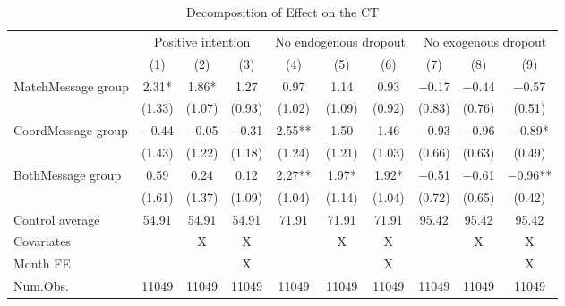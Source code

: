 \documentclass[12pt, a4paper]{article}
\begin{document}
\begin{table}[H]

\caption{\label{tab:lm-test-decompose}Decomposition of Effect on the CT}
\centering
\fontsize{8}{10}\selectfont
\begin{threeparttable}
\begin{tabular}[t]{>{\raggedright\arraybackslash}p{20em}ccccccccc}
\toprule
\multicolumn{1}{c}{ } & \multicolumn{3}{c}{Positive intention} & \multicolumn{3}{c}{No endogenous dropout} & \multicolumn{3}{c}{No exogenous dropout} \\
\cmidrule(l{3pt}r{3pt}){2-4} \cmidrule(l{3pt}r{3pt}){5-7} \cmidrule(l{3pt}r{3pt}){8-10}
  & (1) & (2) & (3) & (4) & (5) & (6) & (7) & (8) & (9)\\
\midrule
MatchMessage group & \num{2.31}* & \num{1.86}* & \num{1.27} & \num{0.97} & \num{1.14} & \num{0.93} & \num{-0.17} & \num{-0.44} & \num{-0.57}\\
 & (\num{1.33}) & (\num{1.07}) & (\num{0.93}) & (\num{1.02}) & (\num{1.09}) & (\num{0.92}) & (\num{0.83}) & (\num{0.76}) & (\num{0.51})\\
CoordMessage group & \num{-0.44} & \num{-0.05} & \num{-0.31} & \num{2.55}** & \num{1.50} & \num{1.46} & \num{-0.93} & \num{-0.96} & \num{-0.89}*\\
 & (\num{1.43}) & (\num{1.22}) & (\num{1.18}) & (\num{1.24}) & (\num{1.21}) & (\num{1.03}) & (\num{0.66}) & (\num{0.63}) & (\num{0.49})\\
BothMessage group & \num{0.59} & \num{0.24} & \num{0.12} & \num{2.27}** & \num{1.97}* & \num{1.92}* & \num{-0.51} & \num{-0.61} & \num{-0.96}**\\
 & (\num{1.61}) & (\num{1.37}) & (\num{1.09}) & (\num{1.04}) & (\num{1.14}) & (\num{1.04}) & (\num{0.72}) & (\num{0.65}) & (\num{0.42})\\
\midrule
Control average & 54.91 & 54.91 & 54.91 & 71.91 & 71.91 & 71.91 & 95.42 & 95.42 & 95.42\\
Covariates &  & X & X &  & X & X &  & X & X\\
Month FE &  &  & X &  &  & X &  &  & X\\
Num.Obs. & \num{11049} & \num{11049} & \num{11049} & \num{11049} & \num{11049} & \num{11049} & \num{11049} & \num{11049} & \num{11049}\\
\bottomrule
\end{tabular}
\begin{tablenotes}

\end{tablenotes}
\end{threeparttable}
\end{table}
\end{document}
